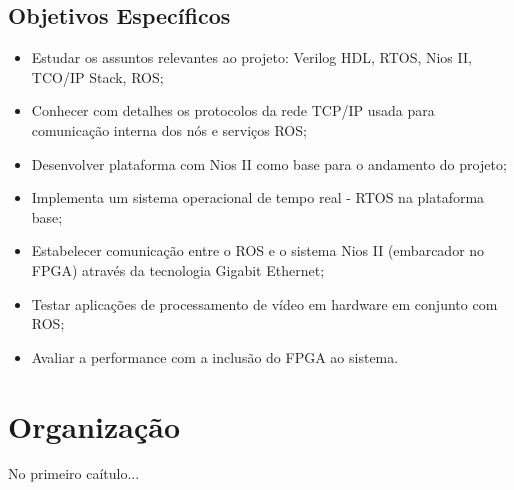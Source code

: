 \subsection{Objetivos Específicos}

\begin{itemize}
    \item Estudar os assuntos relevantes ao projeto: Verilog HDL, RTOS, Nios II, TCO/IP Stack, ROS;
    \item Conhecer com detalhes os protocolos da rede TCP/IP usada para comunicação interna dos nós e serviços ROS;
    \item Desenvolver plataforma com Nios II como base para o andamento do projeto;
    \item Implementa um sistema operacional de tempo real - RTOS na plataforma base;
    \item Estabelecer comunicação entre o ROS e o sistema Nios II (embarcador no FPGA) através da tecnologia Gigabit Ethernet;
    \item Testar aplicações de processamento de vídeo em hardware em conjunto com ROS;
    \item Avaliar a performance com a inclusão do FPGA ao sistema.
\end{itemize}


\section{Organização}

 No primeiro caítulo...